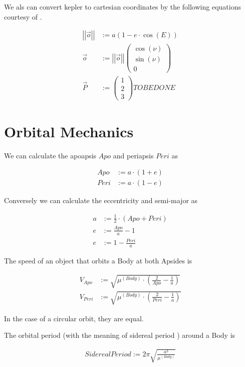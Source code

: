 \documentclass[11pt]{article}
\newcommand{\oa}[1]{\overrightarrow{#1}}
\newcommand{\Pos}{\oa{P}}
\newcommand{\absvec}[1]{\left|\left|{#1}\right|\right|}
\newcommand{\dddvec}[3]{\left(\begin{smallmatrix}{#1}\\{#2}\\{#3}\end{smallmatrix}\right)}
\begin{document}
We als can convert kepler to cartesian coordinates by the following
equations courtesy of \cite{RSKC}.



\begin{align}
  \absvec{\oa{o}} & := a(1-e \cdot \cos(E))\\
  \oa{o} & := \absvec{\oa{o}} \dddvec{\cos(\nu)}{\sin(\nu)}{0}\\
  \Pos & := \dddvec{1}{2}{3} TO BE DONE
\end{align}


\section{Orbital Mechanics}

We can calculate the apoapsis $Apo$ and periapsis $Peri$ as

\begin{align}
Apo & := a \cdot (1 + e)\\
Peri & := a \cdot (1 - e)
\end{align}

Conversely we can calculate the eccentricity and semi-major as

\begin{align}
  a & := \frac{1}{2}\cdot(Apo + Peri)\\
  e & := \frac{Apo}{a} - 1\\
  e & := 1 - \frac{Peri}{a}
\end{align}

The speed of an object that orbits a Body at both Apsides is

\begin{align}
V_{Apo} & := \sqrt{\mu^{(Body)} \cdot \left(\frac{2}{Apo} - \frac{1}{a}\right)}\\
V_{Peri} & := \sqrt{\mu^{(Body)} \cdot\left(\frac{2}{Peri} - \frac{1}{a}\right)}
\end{align}

In the case of a circular orbit, they are equal.

The orbital period (with the meaning of sidereal period \cite{SIDPER}) around a Body is

\begin{align}
SiderealPeriod := 2\pi\sqrt{\frac{a^3}{\mu^{(Body)}}}
\end{align}
\end{document}
